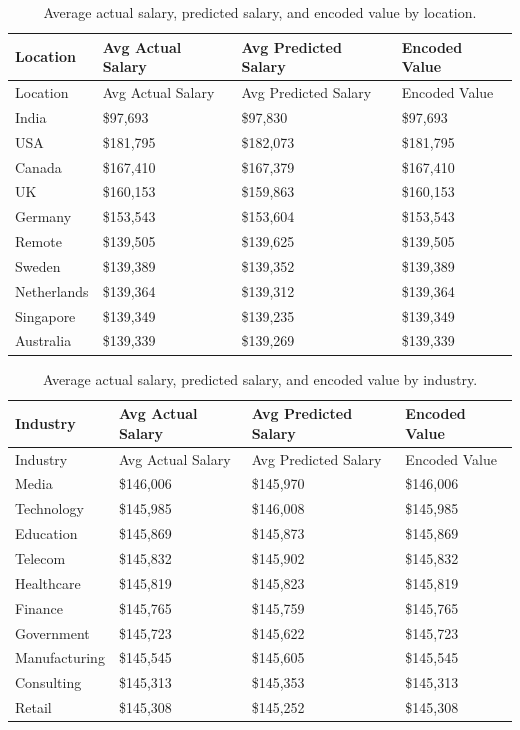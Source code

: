 \documentclass[
]{article}
\begin{document}
\begin{longtable}[]{@{}llll@{}}
\caption{Average actual salary, predicted salary, and encoded value by
location.}\tabularnewline
\toprule\noalign{}
Location & Avg Actual Salary & Avg Predicted Salary & Encoded Value \\
\midrule\noalign{}
\endfirsthead
\toprule\noalign{}
Location & Avg Actual Salary & Avg Predicted Salary & Encoded Value \\
\midrule\noalign{}
\endhead
\bottomrule\noalign{}
\endlastfoot
India & \$97,693 & \$97,830 & \$97,693 \\
USA & \$181,795 & \$182,073 & \$181,795 \\
Canada & \$167,410 & \$167,379 & \$167,410 \\
UK & \$160,153 & \$159,863 & \$160,153 \\
Germany & \$153,543 & \$153,604 & \$153,543 \\
Remote & \$139,505 & \$139,625 & \$139,505 \\
Sweden & \$139,389 & \$139,352 & \$139,389 \\
Netherlands & \$139,364 & \$139,312 & \$139,364 \\
Singapore & \$139,349 & \$139,235 & \$139,349 \\
Australia & \$139,339 & \$139,269 & \$139,339 \\
\end{longtable}

\begin{longtable}[]{@{}llll@{}}
\caption{Average actual salary, predicted salary, and encoded value by
industry.}\tabularnewline
\toprule\noalign{}
Industry & Avg Actual Salary & Avg Predicted Salary & Encoded Value \\
\midrule\noalign{}
\endfirsthead
\toprule\noalign{}
Industry & Avg Actual Salary & Avg Predicted Salary & Encoded Value \\
\midrule\noalign{}
\endhead
\bottomrule\noalign{}
\endlastfoot
Media & \$146,006 & \$145,970 & \$146,006 \\
Technology & \$145,985 & \$146,008 & \$145,985 \\
Education & \$145,869 & \$145,873 & \$145,869 \\
Telecom & \$145,832 & \$145,902 & \$145,832 \\
Healthcare & \$145,819 & \$145,823 & \$145,819 \\
Finance & \$145,765 & \$145,759 & \$145,765 \\
Government & \$145,723 & \$145,622 & \$145,723 \\
Manufacturing & \$145,545 & \$145,605 & \$145,545 \\
Consulting & \$145,313 & \$145,353 & \$145,313 \\
Retail & \$145,308 & \$145,252 & \$145,308 \\
\end{longtable}
\end{document}
